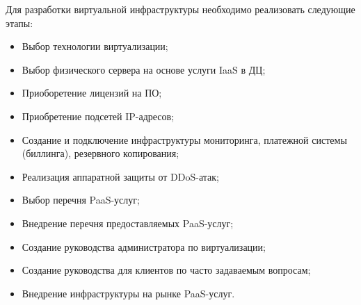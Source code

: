 Для разработки виртуальной инфраструктуры необходимо реализовать следующие этапы:
\begin{itemize}
    \item Выбор технологии виртуализации;
    \item Выбор физического сервера на основе услуги IaaS в ДЦ;
    \item Приоборетение лицензий на ПО;
    \item Приобретение подсетей IP-адресов;
    \item Создание и подключение инфраструктуры мониторинга, платежной системы (биллинга), резервного копирования;
    \item Реализация аппаратной защиты от DDoS-атак;
    \item Выбор перечня PaaS-услуг;
    \item Внедрение перечня предоставляемых PaaS-услуг;
    \item Создание руководства администратора по виртуализации;
    \item Создание руководства для клиентов по часто задаваемым вопросам;
    \item Внедрение инфраструктуры на рынке PaaS-услуг.
\end{itemize}

\clearpage
